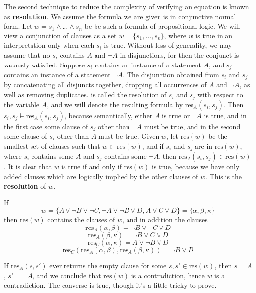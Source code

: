 The second technique to reduce the complexity of verifying an equation is known as {\bf resolution}. We assume the formula we are given is in conjunctive normal form. Let $w = s_1 \wedge \dots \wedge s_n$ be be such a formula of propositional logic. We will view a conjunction of clauses as a set $w = \{ s_1, \dots, s_n \}$, where $w$ is true in an interpretation only when each $s_i$ is true. Without loss of generality, we may assume that no $s_i$ contains $A$ and $\neg A$ in disjunctions, for then the conjunct is vacously satisfied. Suppose $s_i$ contains an instance of a statement $A$, and $s_j$ contains an instance of a statement $\neg A$. The disjunction obtained from $s_i$ and $s_j$ by concatenating all disjuncts together, dropping all occurrences of $A$ and $\neg A$, as well as removing duplicates, is called the resolution of $s_i$ and $s_j$ with respect to the variable $A$, and we will denote the resulting formula by $\text{res}_A(s_i,s_j)$. Then $s_i, s_j \vDash \text{res}_A(s_i,s_j)$, because semantically, either $A$ is true or $\neg A$ is true, and in the first case some clause of $s_j$ other than $\neg A$ must be true, and in the second some clause of $s_i$ other than $A$ must be true. Given $w$, let $\text{res}(w)$ be the smallest set of clauses such that $w \subset \text{res}(w)$, and if $s_i$ and $s_j$ are in $\text{res}(w)$, where $s_i$ contains some $A$ and $s_j$ contains some $\neg A$, then $\text{res}_A(s_i,s_j) \in \text{res}(w)$. It is clear that $w$ is true if and only if $\text{res}(w)$ is true, because we have only added clauses which are logically implied by the other clauses of $w$. This is the {\bf resolution} of $w$.

\begin{example}
    If
    \[ w = \{ A \vee \neg B \vee \neg C, \neg A \vee \neg B \vee D, A \vee C \vee D \} = \{ \alpha, \beta, \kappa \} \]
    then $\text{res}(w)$ contains the clauses of $w$, and in addition the clauses
    \[ \text{res}_A(\alpha, \beta) = \neg B \vee \neg C \vee D  \]
    \[ \text{res}_A(\beta, \kappa) = \neg B \vee C \vee D \]
    \[ \text{res}_C(\alpha, \kappa) = A \vee \neg B \vee D \]
    \[ \text{res}_C(\text{res}_A(\alpha, \beta), \text{res}_A(\beta, \kappa)) = \neg B \vee D \]
\end{example}

If $\text{res}_A(s,s')$ ever returns the empty clause for some $s,s' \in \text{res}(w)$, then $s = A$, $s' = \neg A$, and we conclude that $\text{res}(w)$ is a contradiction, hence $w$ is a contradiction. The converse is true, though it's a little tricky to prove.

